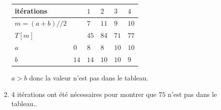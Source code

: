 \documentclass[11pt,a4paper]{article}
\newcounter{num}
\newcounter{numexo}
\begin{document}
\begin{enumerate}
\begin{enumerate}
\begin{tabular}{|C{2.5cm}*{5}{|C{1cm}}|}\hline
itérations &&$1$&$2$&$3$&$4$\\\hline
$m=(a+b)//2$&&$7$&$11$&$9$&$10$\\\hline
$T[m]$&&$45$&$84$&$71$&$77$\\\hline
$a$&$0$&$8$&$8$&$10$&$10$\\\hline
$b$&$14$&$14$&$10$&$10$&$9$\\\hline
\end{tabular}\medskip

$a>b$ donc la valeur n'est pas dans le tableau.

\item 4 itérations ont été nécessaires pour montrer que $75$ n'est pas dans le tableau..
\end{enumerate}
\end{enumerate}


\addtocounter{numexo}{1}
\end{document}
